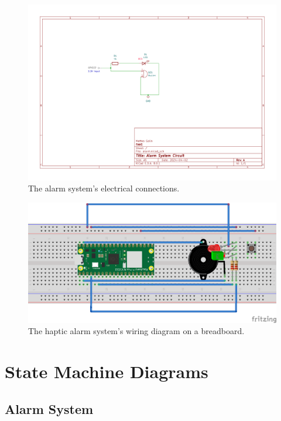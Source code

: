 \begin{figure}[H]
    \centering
    \includegraphics[width=5in]{../assets/schematics/Alarm-Schematic.png}
    \caption{The alarm system's electrical connections.}
\end{figure}

\begin{figure}[H]
    \centering
    \includegraphics[width=5in]{../assets/schematics/fritzingpico.png}
    \caption{The haptic alarm system's wiring diagram on a breadboard.}
\end{figure}

\section{State Machine Diagrams}

\subsection{Alarm System}

